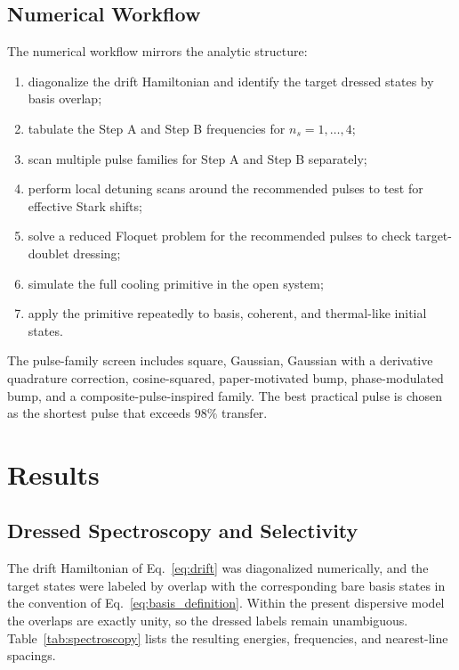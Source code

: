 \documentclass[aps,pra,twocolumn,reprint,floatfix,amsmath,amssymb]{revtex4-2}
\begin{document}
\subsection{Numerical Workflow}
The numerical workflow mirrors the analytic structure:
\begin{enumerate}
\item diagonalize the drift Hamiltonian and identify the target dressed states by basis overlap;
\item tabulate the Step A and Step B frequencies for \(n_s=1,\ldots,4\);
\item scan multiple pulse families for Step A and Step B separately;
\item perform local detuning scans around the recommended pulses to test for effective Stark shifts;
\item solve a reduced Floquet problem for the recommended pulses to check target-doublet dressing;
\item simulate the full cooling primitive in the open system;
\item apply the primitive repeatedly to basis, coherent, and thermal-like initial states.
\end{enumerate}

The pulse-family screen includes square, Gaussian, Gaussian with a derivative quadrature correction, cosine-squared, paper-motivated bump, phase-modulated bump, and a composite-pulse-inspired family. The best practical pulse is chosen as the shortest pulse that exceeds \(98\%\) transfer.

\section{Results}
\label{sec:results}

\subsection{Dressed Spectroscopy and Selectivity}
The drift Hamiltonian of Eq.~\eqref{eq:drift} was diagonalized numerically, and the target states were labeled by overlap with the corresponding bare basis states in the convention of Eq.~\eqref{eq:basis_definition}. Within the present dispersive model the overlaps are exactly unity, so the dressed labels remain unambiguous. Table~\ref{tab:spectroscopy} lists the resulting energies, frequencies, and nearest-line spacings.
\end{document}
